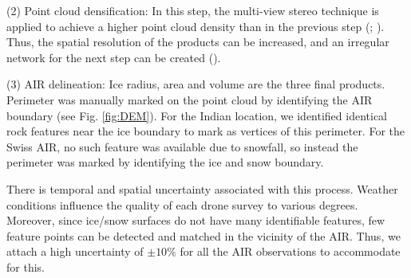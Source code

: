 (2) Point cloud densification: In this step, the multi-view stereo technique is applied to achieve a higher
point cloud density than in the previous step (\cite{furukawaAccurateDenseRobust2010};
\cite{molgStructurefromMotionUsingHistorical2017}). Thus, the spatial resolution of the products can be
increased, and an irregular network for the next step can be created (\cite{kungACCURACYAUTOMATICPHOTOGRAMMETRIC2011}).

(3) AIR delineation: Ice radius, area and volume are the three final products. Perimeter was manually marked
on the point cloud by identifying the AIR boundary (see Fig. \ref{fig:DEM}). For the Indian location, we identified identical rock features
near the ice boundary to mark as vertices of this perimeter. For the Swiss AIR, no such feature was available due
to snowfall, so instead the perimeter was marked by identifying the ice and snow boundary.

There is temporal and spatial uncertainty associated with this process. Weather conditions influence the quality
of each drone survey to various degrees. Moreover, since ice/snow surfaces do not have many identifiable features, few
feature points can be detected and matched in the vicinity of the AIR. Thus, we attach a high uncertainty of
$\pm 10 \%$ for all the AIR observations to accommodate for this.

